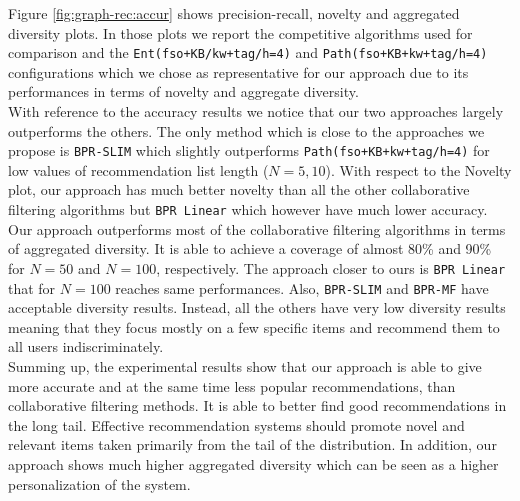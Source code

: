 Figure \ref{fig:graph-rec:accur} shows precision-recall, novelty and aggregated diversity plots. In those plots we report the competitive algorithms used for comparison and the \texttt{Ent(fso+KB/kw+tag/h=4)} and \texttt{Path(fso+KB+kw+tag/h=4)} configurations which we chose as representative for our approach due to its performances in terms of novelty and aggregate diversity. 
\\With reference to the accuracy results we notice that our two approaches largely outperforms the others. The only method which is close to the approaches we propose is \texttt{BPR-SLIM} which slightly outperforms \texttt{Path(fso+KB+kw+tag/h=4)} for low values of recommendation list length ($N=5,10$). %
With respect to the Novelty plot, our approach has much better novelty than all the other collaborative filtering algorithms but \texttt{BPR Linear} which however have much lower accuracy. 
Our approach outperforms most of the collaborative filtering algorithms in terms of aggregated diversity. It is able to achieve a coverage of almost 80\% and 90\% for $N=50$ and $N=100$, respectively. The approach closer to ours is \texttt{BPR Linear} that for $N=100 $ reaches same performances. Also, \texttt{BPR-SLIM} and \texttt{BPR-MF} have acceptable diversity results. Instead, all the others have very low diversity results meaning that they focus mostly on a few specific items and recommend them to all users indiscriminately. 
\\Summing up, the experimental results show that our approach is able to give more accurate and at the same time less popular recommendations, than collaborative filtering methods. It is able to better find good recommendations in the long tail. 
Effective recommendation systems should promote novel and relevant items taken primarily from the tail of the distribution. 
In addition, our approach shows much higher aggregated diversity which can be seen as a higher personalization of the system. 

